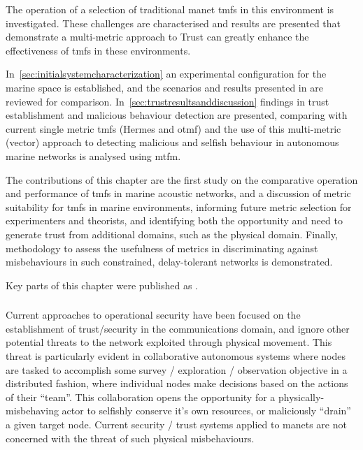 The operation of a selection of traditional \gls{manet} \glspl{tmf} in this environment is investigated.
These challenges are characterised and results are presented that demonstrate a multi-metric approach to Trust can greatly enhance the effectiveness of \glspl{tmf} in these environments.

In~\autoref{sec:initialsystemcharacterization} an experimental configuration for the marine space is established, and the scenarios and results presented in \citet{Guo11} are reviewed for comparison.
In~\autoref{sec:trustresultsanddiscussion} findings in trust establishment and malicious behaviour detection are presented, comparing with current single metric \glspl{tmf} (Hermes and \gls{otmf}) and the use of this multi-metric (vector) approach to detecting malicious and selfish behaviour in autonomous marine networks is analysed using \gls{mtfm}.

The contributions of this chapter are the first study on the comparative operation and performance of \glspl{tmf} in marine acoustic networks, and a discussion of metric suitability for \glspl{tmf} in marine environments, informing future metric selection for experimenters and theorists, and identifying both the opportunity and need to generate trust from additional domains, such as the physical domain.
Finally, methodology to assess the usefulness of metrics in discriminating against misbehaviours in such constrained, delay-tolerant networks is demonstrated.

Key parts of this chapter were published as .

\subsubsection{}

Current approaches to operational security have been focused on the establishment of trust/security in the communications domain, and ignore other potential threats to the network exploited through physical movement.
This threat is particularly evident in collaborative autonomous systems where nodes are tasked to accomplish some survey / exploration / observation objective in a distributed fashion, where individual nodes make decisions based on the actions of their ``team''. 
This collaboration opens the opportunity for a physically-misbehaving actor to selfishly conserve it's own resources, or maliciously ``drain'' a given target node.
Current security / trust systems applied to \glspl{manet} are not concerned with the threat of such physical misbehaviours.

